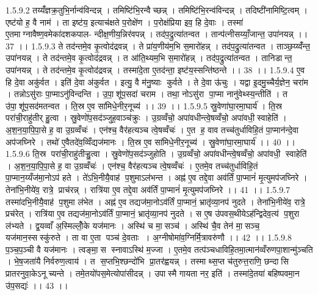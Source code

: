 1.5.9.2
तय्यँ॑ज्ञक्र॒तुभि॒र्नान्व॑विन्दन्न् । तमिष्टि॑भि॒रन्वैच्छन्न् । तमिष्टि॑भि॒रन्व॑विन्दन्न् । तदिष्टी॑नामिष्टि॒त्वम् । एष्ट॑यो ह॒ वै नाम॑ । ता इष्ट॑य॒ इत्याच॑क्षते प॒रोक्षे॑ण । प॒रोक्ष॑प्रिया इव॒ हि दे॒वाः । तस्मा॑ ए॒तमाग्नावैष्ण॒वमेका॑दशकपाल- न्दीक्ष॒णीय॒न्निर॑वपन्न् । तद॑प॒द्रुत्या॑तन्वत । तान्प॑त्नीसय्याँ॒जान्त॒ उपा॑नयन्न् ।। 37 ।।
1.5.9.3
ते तद॑न्तमे॒व कृ॒त्वोद॑द्रवन्न् । ते प्रा॑य॒णीय॑म॒भि स॒मारो॑हन्न् । तद॑प॒द्रुत्या॑तन्वत । ताञ्छ॒य्य्वँ॑न्त॒ उपा॑नयन्न् । ते तद॑न्तमे॒व कृ॒त्वोद॑द्रवन्न् । त आ॑ति॒थ्यम॒भि स॒मारो॑हन्न् । तद॑प॒द्रुत्या॑तन्वत । तानिडान्त॒ उपा॑नयन्न् । ते तद॑न्तमे॒व कृ॒त्वोद॑द्रवन्न् । तस्मा॑दे॒ता ए॒तद॑न्ता॒ इष्ट॑य॒स्सन्ति॑ष्ठन्ते ।। 38 ।।
1.5.9.4
ए॒व हि दे॒वा अकु॑र्वत । इति॑ दे॒वा अ॑कुर्वत । इत्यु॒ वै म॑नु॒ष्याः कुर्वते । ते दे॒वा ऊ॑चुः । यद्वा इ॒दमु॒च्चैर्य॒ज्ञेन॒ चरा॑म । तन्नोऽसु॑राः पा॒प्माऽनु॑विन्दन्ति । उ॒पा॒॒शू॑प॒सदा॑ चराम । तथा॒ नोऽसु॑रा पा॒प्मा नानु॑वेथ्स्य॒न्तीति॑ । त उ॑पा॒॒शू॑प॒सद॑मतन्वत । ति॒स्र ए॒व सा॑मिधे॒नीर॒नूच्य॑ ।। 39 ।।
1.5.9.5
स्रु॒वेणा॑घा॒रमा॒घार्य॑ । ति॒स्र परा॑ची॒राहु॑तीर् हु॒त्वा । स्रु॒वेणो॑प॒सद॑ञ्जुह॒वाञ्च॑क्रुः । उ॒ग्रव्वँचो॒ अपा॑वधीन्त्वे॒षव्वँचो॒ अपा॑वधी॒॒स्वाहेति॑ । अ॒श॒न॒या॒पि॒पा॒से ह॒ वा उ॒ग्रव्वँचः॑ । एन॑श्च॒ वैर॑हत्यञ्च त्वे॒षव्वँचः॑ । ए॒त ह॒ वाव तच्च॑तुर्धाविहि॒तं पा॒प्मान॑न्दे॒वा अप॑जघ्निरे । तथो॑ ए॒वैतदे॑व॒व्विँद्यज॑मानः । ति॒स्र ए॒व सा॑मिधे॒नीर॒नूच्य॑ । स्रु॒वेणा॑घा॒रमा॒घार्य॑ ।। 40 ।।
1.5.9.6
ति॒स्र परा॑ची॒राहु॑तीऱ्हु॒त्वा । स्रु॒वेणो॑प॒सद॑ञ्जुहोति । उ॒ग्रव्वँचो॒ अपा॑वधीन्त्वे॒षव्वँचो॒ अपा॑वधी॒॒ स्वाहेति॑ । अ॒श॒न॒या॒पि॒पा॒से ह॒ वा उ॒ग्रव्वँचः॑ । एन॑श्च॒ वैर॑हत्यञ्च त्वे॒षव्वँचः॑ । ए॒तमे॒व तच्च॑तुर्धाविहि॒तं पा॒प्मान॒य्यँज॑मा॒नोऽप॑ हते । ते॑ऽभि॒नीयै॒वाह॑ प॒शुमाऽल॑भन्त । अह्न॑ ए॒व तद्दे॒वा अव॑र्तिं पा॒प्मानं॑ मृ॒त्युमप॑जघ्निरे । तेना॑भि॒नीये॑व॒ रात्रे॒ प्राच॑रन्न् । रात्रि॑या ए॒व तद्दे॒वा अव॑र्तिं पा॒प्मानं॑ मृ॒त्युमप॑जघ्निरे ।। 41 ।।
1.5.9.7
तस्मा॑दभि॒नीयै॒वाह॑ प॒शुमा ल॑भेत । अह्न॑ ए॒व तद्यज॑मा॒नोऽव॑र्तिं पा॒प्मानं॒ भ्रातृ॑व्या॒नप॑ नुदते । तेना॑भि॒नीये॑व॒ रात्रे॒ प्रच॑रेत् । रात्रि॑या ए॒व तद्यज॑मा॒नोऽव॑र्तिं पा॒प्मानं॒ भ्रातृ॑व्या॒नप॑ नुदते । स ए॒ष उ॑पवस॒थीयेऽह॑न्द्विदेव॒त्य॑ प॒शुरा ल॑भ्यते । द्व॒यव्वाँ अ॒स्मिल्लोँ॒के यज॑मानः । अस्थि॑ च मा॒॒सञ्च॑ । अस्थि॑ चै॒व तेन॑ मा॒॒सञ्च॒ यज॑मान॒स्सस्कु॑रुते । ता वा ए॒ता पञ्च॑ दे॒वताः । अ॒ग्नीषोमा॑व॒ग्निर्मि॒त्रावरु॑णौ ।। 42 ।।
1.5.9.8
प॒ञ्च॒प॒ञ्ची वै यज॑मानः । त्वङ्मा॒॒स स्नावाऽस्थि॑ म॒ज्जा । ए॒तमे॒व तत्प॑ञ्चधाविहि॒तमा॒त्मान॑व्वँरुणपा॒शान्मु॑ञ्चति । भे॒ष॒जता॑यै निर्वरुण॒त्वाय॑ । त स॒प्तभि॒श्छन्दो॑भि प्रा॒तर॑ह्वयन्न् । तस्माथ्स॒प्त च॑तुरुत्त॒राणि॒ छन्दा॑सि प्रातरनुवा॒केऽनूच्यन्ते । तमे॒तयो॑पस॒मेत्योपा॑सीदन्न् । उपास्मै गायता नर॒ इति॑ । तस्मा॑दे॒तया॑ बहिष्पवमा॒न उ॑प॒सद्यः॑ ।। 43 ।।

